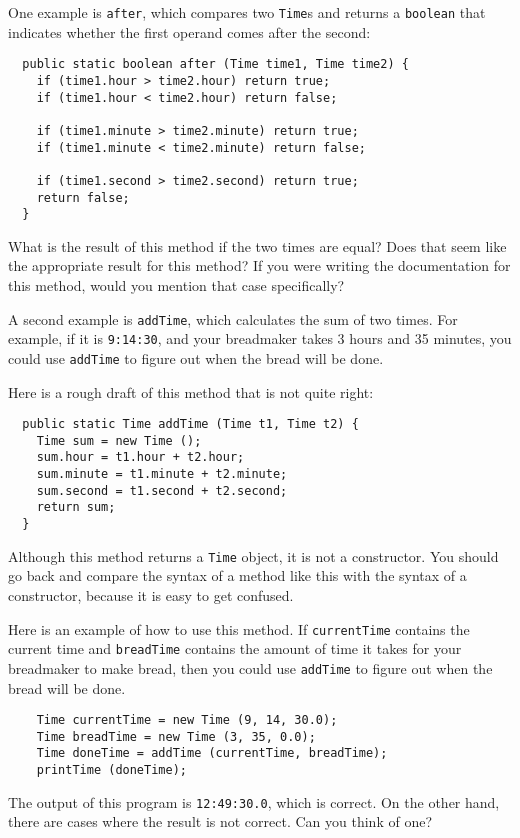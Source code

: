 \documentclass{book}
\begin{document}
One example is {\tt after}, which compares two {\tt Time}s and
returns a {\tt boolean} that indicates whether the first operand
comes after the second:

\begin{verbatim}
  public static boolean after (Time time1, Time time2) {
    if (time1.hour > time2.hour) return true;
    if (time1.hour < time2.hour) return false;

    if (time1.minute > time2.minute) return true;
    if (time1.minute < time2.minute) return false;

    if (time1.second > time2.second) return true;
    return false;
  }
\end{verbatim}
%
What is the result of this method if the two times are equal?  Does
that seem like the appropriate result for this method?  If you were
writing the documentation for this method, would you mention that case
specifically?

A second example is {\tt addTime}, which calculates the sum of two
times.  For example, if it is {\tt 9:14:30}, and your breadmaker takes
3 hours and 35 minutes, you could use {\tt addTime} to figure out when
the bread will be done.

Here is a rough draft of this method that is not quite right:

\begin{verbatim}
  public static Time addTime (Time t1, Time t2) {
    Time sum = new Time ();
    sum.hour = t1.hour + t2.hour;
    sum.minute = t1.minute + t2.minute;
    sum.second = t1.second + t2.second;
    return sum;
  }
\end{verbatim}
%
Although this method returns a {\tt Time} object, it is not
a constructor.  You should go back and compare the syntax of
a method like this with the syntax of a constructor, because
it is easy to get confused.

Here is an example of how to use this method.  If {\tt currentTime}
contains the current time and {\tt breadTime} contains the amount
of time it takes for your breadmaker to make bread, then you
could use {\tt addTime} to figure out when the bread will be
done.

\begin{verbatim}
    Time currentTime = new Time (9, 14, 30.0);
    Time breadTime = new Time (3, 35, 0.0);
    Time doneTime = addTime (currentTime, breadTime);
    printTime (doneTime);
\end{verbatim}
%
The output of this program is {\tt 12:49:30.0}, which is
correct.  On the other hand, there are cases where the result
is not correct.  Can you think of one?
\end{document}
